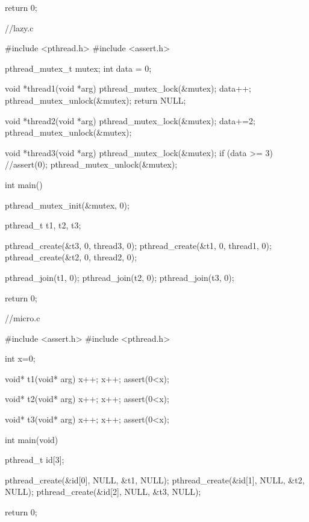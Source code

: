 \documentclass[diploma, english]{softlab-thesis}
\theoremstyle{definition}
\begin{document}
\begin{code_appendix}
{	return 0;
}

//lazy.c

#include <pthread.h>
#include <assert.h>

pthread_mutex_t  mutex;
int data = 0;

void *thread1(void *arg)
{
  pthread_mutex_lock(&mutex);
  data++;
  pthread_mutex_unlock(&mutex);
  return NULL;
}


void *thread2(void *arg)
{
  pthread_mutex_lock(&mutex);
  data+=2;
  pthread_mutex_unlock(&mutex);
}


void *thread3(void *arg)
{
  pthread_mutex_lock(&mutex);
  if (data >= 3){
    //assert(0);
  }
  pthread_mutex_unlock(&mutex);    
}


int main()
{
  pthread_mutex_init(&mutex, 0);

  pthread_t t1, t2, t3;

  pthread_create(&t3, 0, thread3, 0);
  pthread_create(&t1, 0, thread1, 0);
  pthread_create(&t2, 0, thread2, 0);

  pthread_join(t1, 0);
  pthread_join(t2, 0);
  pthread_join(t3, 0);
  
  return 0;
}

//micro.c

#include <assert.h>
#include <pthread.h>

int x=0;

void* t1(void* arg)
{
  x++;
  x++;
  assert(0<x);
}

void* t2(void* arg)
{
  x++;
  x++;
  assert(0<x);
}

void* t3(void* arg)
{
  x++;
  x++;
  assert(0<x);
}

int main(void)
{
  pthread_t id[3];

  pthread_create(&id[0], NULL, &t1, NULL);
  pthread_create(&id[1], NULL, &t2, NULL);
  pthread_create(&id[2], NULL, &t3, NULL);

  return 0;
}

\end{code_appendix}
\end{document}

